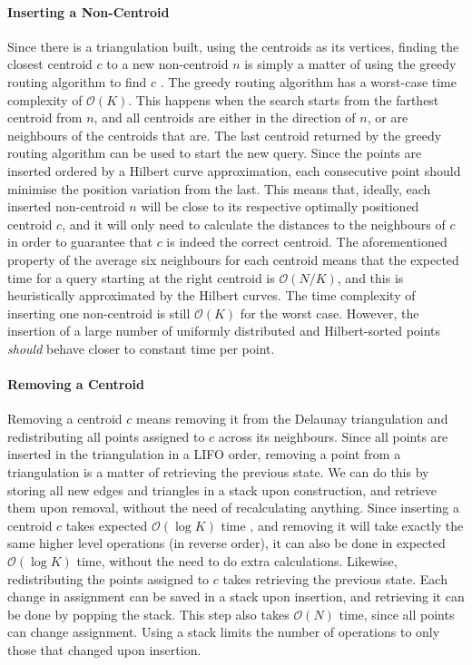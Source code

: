 \paragraph{Inserting a Non-Centroid}
Since there is a triangulation built, using the centroids as its vertices, finding the closest centroid $c$ to a new non-centroid $n$ is simply a matter of using the greedy routing algorithm to find $c$ \cite{greedyroute}.
The greedy routing algorithm has a worst-case time complexity of $\mathcal{O}(K)$. This happens when the search starts from the farthest centroid from $n$, and all centroids are either in the direction of $n$, or are neighbours of the centroids that are. 
The last centroid returned by the greedy routing algorithm can be used to start the new query. Since the points are inserted ordered by a Hilbert curve approximation, each consecutive point should minimise the position variation from the last.
This means that, ideally, each inserted non-centroid $n$ will be close to its respective optimally positioned centroid $c$, and it will only need to calculate the distances to the neighbours of $c$ in order to guarantee that $c$ is indeed the correct centroid.
The aforementioned property of the average six neighbours for each centroid means that the expected time for a query starting at the right centroid is $\mathcal{O}(N/K)$, and this is heuristically approximated by the Hilbert curves.
The time complexity of inserting one non-centroid is still $\mathcal{O}(K)$ for the worst case. However, the insertion of a large number of uniformly distributed and Hilbert-sorted points \emph{should} behave closer to constant time per point.

\paragraph{Removing a Centroid}
Removing a centroid $c$ means removing it from the Delaunay triangulation and redistributing all points assigned to $c$ across its neighbours.
Since all points are inserted in the triangulation in a LIFO order, removing a point from a triangulation is a matter of retrieving the previous state. We can do this by storing all new edges and triangles in a stack upon construction, and retrieve them upon removal, without the need of recalculating anything. Since inserting a centroid $c$ takes expected $\mathcal{O}(\log{K})$ time \cite{tricomplex}, and removing it will take exactly the same higher level operations (in reverse order), it can also be done in expected $\mathcal{O}(\log{K})$ time, without the need to do extra calculations.
Likewise, redistributing the points assigned to $c$ takes retrieving the previous state. Each change in assignment can be saved in a stack upon insertion, and retrieving it can be done by popping the stack.
This step also takes $\mathcal{O}(N)$ time, since all points can change assignment. Using a stack limits the number of operations to only those that changed upon insertion.

